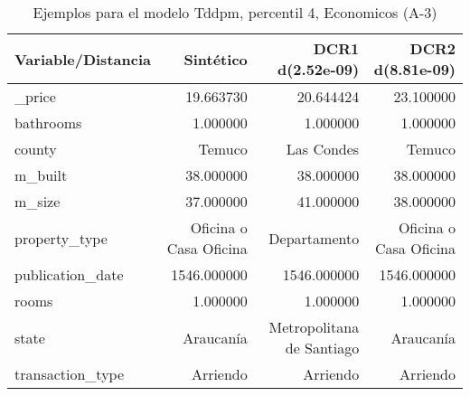 \begin{table}[H]
\centering
\fontsize{10}{14}\selectfont
\caption{Ejemplos para el modelo Tddpm, percentil 4, Economicos (A-3)}
\label{table-example-economicos-a-3-tddpm_mlp-4p}
\begin{tabular}{|l|r|r|r|}
\hline
\rowcolor[gray]{0.8}
Variable/Distancia & Sintético & DCR1 d(2.52e-09) & DCR2 d(8.81e-09) \\
\hline \_price & \cellcolor[rgb]{0.9, 0.54, 0.52} 19.663730 & 20.644424 & 23.100000 \\
\hline bathrooms & \cellcolor[rgb]{0.9, 0.54, 0.52} 1.000000 & \cellcolor[rgb]{0.9, 0.54, 0.52} 1.000000 & \cellcolor[rgb]{0.9, 0.54, 0.52} 1.000000 \\
\hline county & \cellcolor[rgb]{0.9, 0.54, 0.52} Temuco & Las Condes & \cellcolor[rgb]{0.9, 0.54, 0.52} Temuco \\
\hline m\_built & \cellcolor[rgb]{0.9, 0.54, 0.52} 38.000000 & \cellcolor[rgb]{0.9, 0.54, 0.52} 38.000000 & \cellcolor[rgb]{0.9, 0.54, 0.52} 38.000000 \\
\hline m\_size & \cellcolor[rgb]{0.9, 0.54, 0.52} 37.000000 & 41.000000 & 38.000000 \\
\hline property\_type & \cellcolor[rgb]{0.9, 0.54, 0.52} Oficina o Casa Oficina & Departamento & \cellcolor[rgb]{0.9, 0.54, 0.52} Oficina o Casa Oficina \\
\hline publication\_date & \cellcolor[rgb]{0.9, 0.54, 0.52} 1546.000000 & \cellcolor[rgb]{0.9, 0.54, 0.52} 1546.000000 & \cellcolor[rgb]{0.9, 0.54, 0.52} 1546.000000 \\
\hline rooms & \cellcolor[rgb]{0.9, 0.54, 0.52} 1.000000 & \cellcolor[rgb]{0.9, 0.54, 0.52} 1.000000 & \cellcolor[rgb]{0.9, 0.54, 0.52} 1.000000 \\
\hline state & \cellcolor[rgb]{0.9, 0.54, 0.52} Araucanía & Metropolitana de Santiago & \cellcolor[rgb]{0.9, 0.54, 0.52} Araucanía \\
\hline transaction\_type & \cellcolor[rgb]{0.9, 0.54, 0.52} Arriendo & \cellcolor[rgb]{0.9, 0.54, 0.52} Arriendo & \cellcolor[rgb]{0.9, 0.54, 0.52} Arriendo \\
\hline
\end{tabular}
\end{table}
